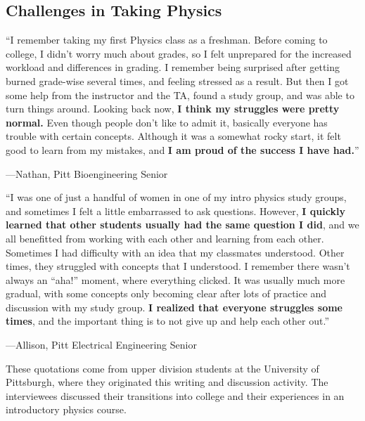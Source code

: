 \documentclass[]{article}
\begin{document}
\begin{PresentSpace}
\section*{Challenges in Taking Physics}
``I remember taking my first Physics class as a freshman.
Before coming to college, I didn't worry much about
grades, so I felt unprepared for the increased workload
and differences in grading. I remember being surprised
after getting burned grade-wise several times, and
feeling stressed as a result. But then I got some help
from the instructor and the TA, found a study group, and
was able to turn things around. Looking back now, \textbf{I
think my struggles were pretty normal.} Even though
people don't like to admit it, basically everyone has
trouble with certain concepts. Although it was a
somewhat rocky start, it felt good to learn from my
mistakes, and \textbf{I am proud of the success I have had.}''
\begin{flushright}
---Nathan, Pitt Bioengineering Senior
\end{flushright}
``I was one of just a handful of women in one of my intro physics
study groups, and sometimes I felt a little embarrassed to ask
questions. However, \textbf{I quickly learned that other students
usually had the same question I did}, and we all benefitted
from working with each other and learning from each other.
Sometimes I had difficulty with an idea that my classmates
understood. Other times, they struggled with concepts that I
understood. I remember there wasn’t always an ``aha!'' moment,
where everything clicked. It was usually much more gradual,
with some concepts only becoming clear after lots of practice
and discussion with my study group. \textbf{I realized that everyone
struggles some times}, and the important thing is to not give
up and help each other out.”
\begin{flushright}
---Allison, Pitt Electrical Engineering Senior
\end{flushright}
\end{PresentSpace}
\newpage
\begin{TeacherMargin}
These quotations come from upper division students at the University of Pittsburgh, where they originated this writing and discussion activity. The interviewees discussed their transitions into college and their experiences in an introductory physics course.
\end{TeacherMargin}
\end{document}
